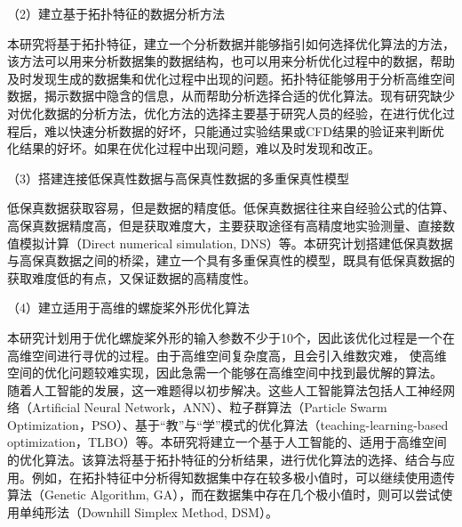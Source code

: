 

（2）建立基于拓扑特征的数据分析方法

本研究将基于拓扑特征，建立一个分析数据并能够指引如何选择优化算法的方法，该方法可以用来分析数据集的数据结构，也可以用来分析优化过程中的数据，帮助及时发现生成的数据集和优化过程中出现的问题。拓扑特征能够用于分析高维空间数据，揭示数据中隐含的信息，从而帮助分析选择合适的优化算法。现有研究缺少对优化数据的分析方法，优化方法的选择主要基于研究人员的经验，在进行优化过程后，难以快速分析数据的好坏，只能通过实验结果或CFD结果的验证来判断优化结果的好坏。如果在优化过程中出现问题，难以及时发现和改正。

（3）搭建连接低保真性数据与高保真性数据的多重保真性模型

低保真数据获取容易，但是数据的精度低。低保真数据往往来自经验公式的估算、高保真数据精度高，但是获取难度大，主要获取途径有高精度地实验测量、直接数值模拟计算（Direct numerical simulation, DNS）等。本研究计划搭建低保真数据与高保真数据之间的桥梁，建立一个具有多重保真性的模型，既具有低保真数据的获取难度低的有点，又保证数据的高精度性。%



（4）建立适用于高维的螺旋桨外形优化算法

本研究计划用于优化螺旋桨外形的输入参数不少于10个，因此该优化过程是一个在高维空间进行寻优的过程。由于高维空间复杂度高，且会引入维数灾难，%
使高维空间的优化问题较难实现，因此急需一个能够在高维空间中找到最优解的算法。
随着人工智能的发展，这一难题得以初步解决。这些人工智能算法包括人工神经网络（Artificial Neural Network，ANN）、粒子群算法（Particle Swarm Optimization，PSO）、基于“教”与“学”模式的优化算法（teaching-learning-based optimization，TLBO）等。本研究将建立一个基于人工智能的、适用于高维空间的优化算法。该算法将基于拓扑特征的分析结果，进行优化算法的选择、结合与应用。例如，在拓扑特征中分析得知数据集中存在较多极小值时，可以继续使用遗传算法（Genetic Algorithm, GA），而在数据集中存在几个极小值时，则可以尝试使用单纯形法（Downhill Simplex Method, DSM）。


